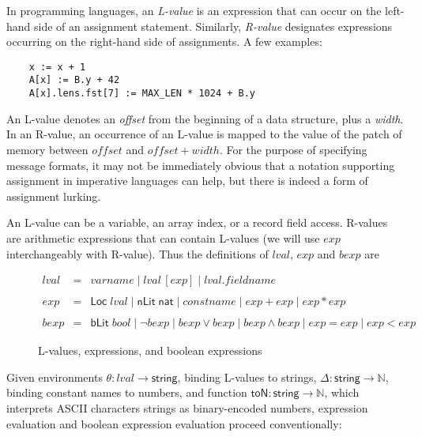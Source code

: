 \documentclass[svgnames]{llncs}
\newcommand{\konst}[1]{\ensuremath{\mathsf{#1}}}
\begin{document}
In programming languages, an \emph{L-value} is an expression that can
occur on the left-hand side of an assignment statement. Similarly,
\emph{R-value} designates expressions occurring on the right-hand side
of assignments. A few examples:

\begin{verbatim}
    x := x + 1
    A[x] := B.y + 42
    A[x].lens.fst[7] := MAX_LEN * 1024 + B.y
\end{verbatim}

An L-value denotes an \emph{offset} from the beginning of a
data structure, plus a \emph{width}. In an R-value, an occurrence of an
L-value is mapped to the value of the patch of memory between
$\mathit{offset}$ and $\mathit{offset} + \mathit{width}$. For the
purpose of specifying message formats, it may not be immediately
obvious that a notation supporting assignment in imperative languages
can help, but there is indeed a form of assignment lurking.

An L-value can be a variable, an array index, or a record field
access. R-values are arithmetic expressions that can contain L-values
(we will use $\mathit{exp}$ interchangeably with R-value). Thus the
definitions of $\mathit{lval}$, $\mathit{exp}$ and $\mathit{bexp}$ are

\begin{figure}
\[
\begin{array}{rcl}
\mathit{lval} & = & \mathit{varname} \mid
                    \mathit{lval} \, [ \mathit{exp} ] \mid
                    \mathit{lval} . \mathit{fieldname} \\
  & & \\
\mathit{exp} & = & \konst{Loc}\; \mathit{lval}
              \mid \konst{nLit}\; \konst{nat}
              \mid \mathit{constname}
              \mid \mathit{exp} + \mathit{exp}
              \mid \mathit{exp} * \mathit{exp} \\
  & & \\
\mathit{bexp} & = & \konst{bLit}\; bool
              \mid  \neg \mathit{bexp}
              \mid  \mathit{bexp} \lor \mathit{bexp}
              \mid  \mathit{bexp} \land \mathit{bexp}
              \mid  \mathit{exp} = \mathit{exp}
              \mid  \mathit{exp} < \mathit{exp}
\end{array}
\]
\caption{L-values, expressions, and boolean expressions}
\end{figure}

Given environments $\theta: \mathit{lval} \to \konst{string}$, binding
L-values to strings, $\Delta : \konst{string} \to \mathbb{N}$, binding
constant names to numbers, and function
$\konst{toN}:\konst{string}\to\mathbb{N}$, which interprets ASCII
characters strings as binary-encoded numbers, expression evaluation
and boolean expression evaluation proceed conventionally:
\end{document}
